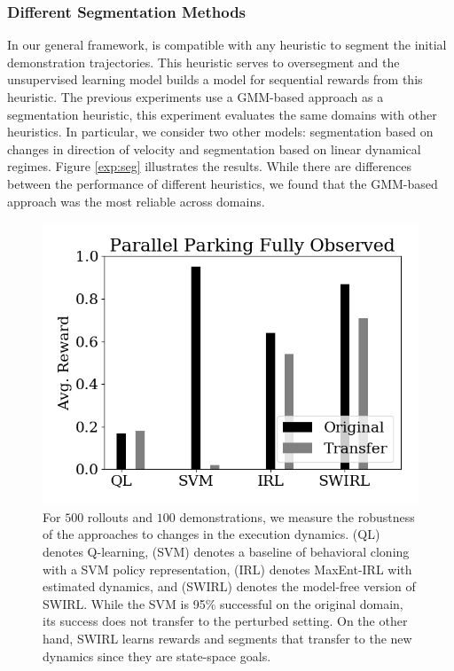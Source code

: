 \subsubsection{Different Segmentation Methods}
In our general framework, \hirl is compatible with any heuristic to segment the initial demonstration trajectories. This heuristic serves to oversegment and the unsupervised learning model builds a model for sequential rewards from this heuristic. The previous experiments use a GMM-based approach as a segmentation heuristic, this experiment evaluates the same domains with other heuristics. In particular, we consider two other models: segmentation based on changes in direction of velocity and segmentation based on linear dynamical regimes. Figure \ref{exp:seg} illustrates the results. While there are differences between the performance of different heuristics, we found that the GMM-based approach was the most reliable across domains.

\begin{figure}[t]
\centering
 \includegraphics[width=0.8\columnwidth]{swirl-experiments/pp-fo3.png}
 \caption{For $500$ rollouts and $100$ demonstrations, we measure the robustness of the approaches to changes in the execution dynamics. (QL) denotes Q-learning, (SVM) denotes a baseline of behavioral cloning with a SVM policy representation, (IRL) denotes MaxEnt-IRL with estimated dynamics, and (SWIRL) denotes the model-free version of SWIRL. While the SVM is 95\% successful on the original domain, its success does not transfer to the perturbed setting. On the other hand, SWIRL learns rewards and segments that transfer to the new dynamics since they are state-space goals. \label{exp:pp-fo3}}
\end{figure}


